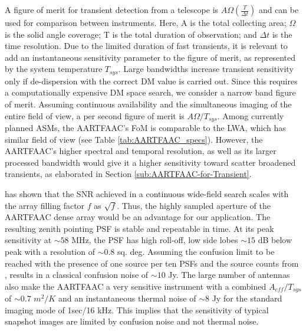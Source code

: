\documentclass{aa}
\begin{document}
A  figure of  merit  for transient  detection  \citep{cordes2004dynamic} from  a
telescope  is  $A\Omega\left(\frac{T}{\Delta  t}\right)$  and can  be  used  for
comparison between instruments.  Here, A  is the total collecting area; $\Omega$
is the solid angle coverage; T is the total duration of observation; and $\Delta
t$ is the time resolution. Due to the limited duration of fast transients, it is
relevant to add  an instantaneous sensitivity parameter to  the figure of merit,
as represented  by the system temperature $T_{sys}$.   Large bandwidths increase
transient sensitivity only if de-dispersion with the correct DM value is carried
out.   Since this  requires  a  computationally expensive  DM  space search,  we
consider a narrow band figure of merit. Assuming continuous availability and the
simultaneous imaging of  the entire field of view, a per  second figure of merit
is  $A\Omega/T_{sys}$.  Among  currently  planned ASMs,  the  AARTFAAC's FoM  is
comparable  to   the  LWA,   which  has  similar   field  of  view   (see  Table
\ref{tab:AARTFAAC_specs}). However, the  AARTFAAC's higher spectral and temporal
resolution, as  well as its  larger processed bandwidth  would give it  a higher
sensitivity  toward  scatter broadened  transients,  as  elaborated in  Section
\ref{sub:AARTFAAC-for-Transient}.

\citet{backer1999pers}  has  shown  that   the  SNR  achieved  in  a  continuous
wide-field search scales with the  array filling factor $f$ as $\sqrt{f}$. Thus,
the highly  sampled aperture of the  AARTFAAC dense array would  be an advantage
for our application. The resulting  zenith pointing PSF is stable and repeatable
in time. At  its peak sensitivity at $\sim$$58$ MHz, the  PSF has high roll-off,
low side  lobes $\sim$$15$ dB  below peak with  a resolution of  $\sim$$0.8$ sq.
deg.  Assuming the confusion limit to be reached with the presence of one source
per ten PSFs and the  source counts from \citet{bregman2012system}, results in a
classical confusion noise  of $\sim$$10$ Jy.  The large  number of antennas also
make the AARTFAAC a very  sensitive instrument with a combined $A_{eff}/T_{sys}$
of  $\sim$$0.7$ $m^{2}/K$ \citep{wijnholds2011situ}  and an  instantaneous thermal
noise of $\sim$$8$ Jy for the  standard imaging mode of 1sec/16 kHz.  This implies
that the sensitivity  of typical snapshot images are  limited by confusion noise
and not thermal noise.
\end{document}
